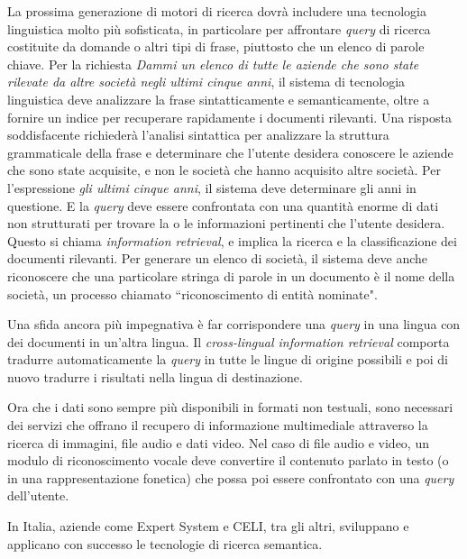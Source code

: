\documentclass[]{../../metanetpaper}
\begin{document}
\begin{multicols}{2}
La prossima generazione di motori di ricerca dovr\`{a} includere una
tecnologia linguistica molto pi\`{u} sofisticata, in particolare per
affrontare \emph{query} di ricerca costituite da domande o altri tipi di
frase, piuttosto che un elenco di parole chiave. Per la richiesta \emph{Dammi un
elenco di tutte le aziende che sono state rilevate da altre societ\`{a} negli
ultimi cinque anni}, il sistema di tecnologia linguistica deve analizzare la
frase sintatticamente e semanticamente, oltre a fornire un indice per
recuperare rapidamente i documenti rilevanti. Una risposta soddisfacente
richieder\`{a} l'analisi sintattica per analizzare la struttura grammaticale
della frase e determinare che l'utente desidera conoscere le aziende che sono
state acquisite, e non le societ\`{a} che hanno acquisito altre
societ\`{a}. Per l'espressione \emph{gli ultimi cinque anni}, il sistema deve
determinare gli anni in questione. E la \emph{query} deve essere confrontata
con una quantit\`{a} enorme di dati non strutturati per trovare la o le
informazioni pertinenti che l'utente desidera. Questo si chiama
\emph{information retrieval}, e implica la ricerca e la classificazione dei 
documenti rilevanti. Per generare un elenco di societ\`{a}, il sistema deve 
anche riconoscere che una particolare stringa di parole in un documento \`{e} 
il nome della societ\`{a}, un processo chiamato “riconoscimento di entit\`{a}
nominate".




Una sfida ancora pi\`{u} impegnativa \`{e} far corrispondere una \emph{query}
in una lingua con dei documenti in un'altra lingua. Il \emph{cross-lingual
  information retrieval} comporta tradurre automaticamente la \emph{query} in
tutte le lingue di origine possibili e poi di nuovo tradurre i risultati nella
lingua di destinazione.

Ora che i dati sono sempre pi\`{u} disponibili in formati non testuali, sono
necessari dei servizi che offrano il recupero di informazione multimediale
attraverso la ricerca di immagini, file audio e dati video. Nel caso di file
audio e video, un modulo di riconoscimento vocale deve convertire il contenuto
parlato in testo (o in una rappresentazione fonetica) che possa poi essere
confrontato con una \emph{query} dell'utente.

In Italia, aziende come Expert System e CELI, tra gli altri, sviluppano e
applicano con successo le tecnologie di ricerca semantica.




\end{multicols}
\end{document}
